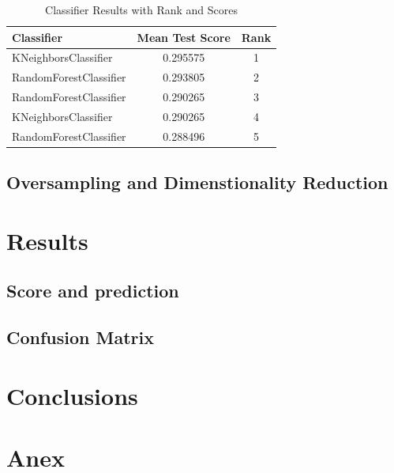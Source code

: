 \documentclass{article}
\begin{document}
\begin{table}[h!]
    \centering
    \caption{Classifier Results with Rank and Scores}
    \label{tab:classifier_ranks}
    \begin{tabular}{lcc}
    \toprule
    \textbf{Classifier}       & \textbf{Mean Test Score} & \textbf{Rank} \\
    \midrule
    KNeighborsClassifier      & 0.295575                & 1 \\
    RandomForestClassifier    & 0.293805                & 2 \\
    RandomForestClassifier    & 0.290265                & 3 \\
    KNeighborsClassifier      & 0.290265                & 4 \\
    RandomForestClassifier    & 0.288496                & 5 \\
    \bottomrule
    \end{tabular}
    \end{table}

\subsection{Oversampling and Dimenstionality Reduction}

\section{Results}

\subsection{Score and prediction}

\subsection{Confusion Matrix}

\section{Conclusions}


\section{Anex}



\end{document}
